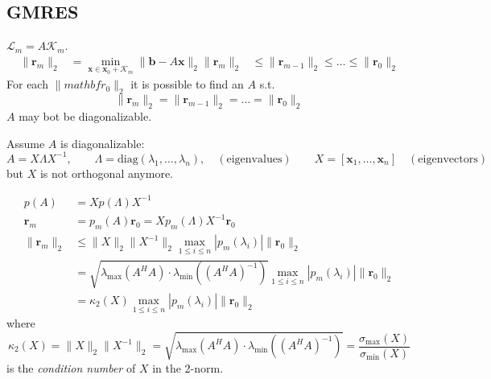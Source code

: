 \subsection{GMRES}
$\mathcal{L}_m = A\mathcal{K}_m$.
\begin{align*}
    \|\mathbf{r}_m\|_2 & = \min_{\mathbf{x} \in \mathbf{x}_0 + \mathcal{K}_m} \|\mathbf{b} - A\mathbf{x}\|_2
    \|\mathbf{r}_m\|_2 & \leq \|\mathbf{r}_{m-1}\|_2 \leq \ldots \leq \|\mathbf{r}_0\|_2
\end{align*}
For each $\|mathbf{r}_0\|_2$ it is possible to find an $A$ s.t.
\[
    \|\mathbf{r}_m\|_2 = \|\mathbf{r}_{m-1}\|_2 = \ldots = \|\mathbf{r}_0\|_2
\]
$A$ may bot be diagonalizable.

Assume $A$ is diagonalizable:
\[
    A = X\Lambda X^{-1}, \qquad \Lambda = \text{diag}(\lambda_1, \ldots, \lambda_n), \quad (\text{eigenvalues})
    \qquad X = [\mathbf{x}_1, \ldots, \mathbf{x}_n] \quad (\text{eigenvectors})
\]
but $X$ is not orthogonal anymore.


\begin{align*}
    p(A)               & = Xp(\Lambda)X^{-1}                                                                                                          \\
    \mathbf{r}_m       & = p_m(A)\mathbf{r}_0 = Xp_m(\Lambda)X^{-1}\mathbf{r}_0                                                                       \\
    \|\mathbf{r}_m\|_2 & \leq \|X\|_2 \|X^{-1}\|_2 \max_{1 \leq i \leq n} |p_m(\lambda_i)| \|\mathbf{r}_0\|_2                                         \\
                       & = \sqrt{\lambda_{\max}(A^H A) \cdot \lambda_{\min}((A^H A)^{-1})} \max_{1 \leq i \leq n} |p_m(\lambda_i)| \|\mathbf{r}_0\|_2 \\
                       & = \kappa_2(X) \max_{1 \leq i \leq n} |p_m(\lambda_i)| \|\mathbf{r}_0\|_2
\end{align*}
where
\[
    \kappa_2(X) = \|X\|_2 \|X^{-1}\|_2 = \sqrt{\lambda_{\max}(A^H A)\cdot \lambda_{\min}((A^H A)^{-1})} = \frac{\sigma_{\max}(X)}{\sigma_{\min}(X)}
\]
is the \emph{condition number} of $X$ in the 2-norm.

